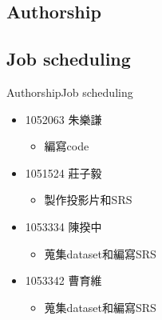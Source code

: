 \documentclass{beamer}
\begin{document}
\begin{CJK*}{UTF8}{bsmi}
\section*{Authorship}
\subsection*{Job scheduling}
\begin{frame}{Authorship}{Job scheduling}
  \begin{itemize}
  \item {
    1052063 朱樂謙
  }
   \begin{itemize}
   \item 編寫code\\[0.5cm]
   \end{itemize}
  \item {
    1051524 莊子毅
  }
   \begin{itemize}
   \item 製作投影片和SRS\\[0.5cm]
   \end{itemize}
  \item {
    1053334 陳揆中
  }
   \begin{itemize}
   \item 蒐集dataset和編寫SRS\\[0.5cm]
   \end{itemize}
  \item {
    1053342 曹育維
  }
   \begin{itemize}
   \item 蒐集dataset和編寫SRS\\[0.5cm]
   \end{itemize}
  \end{itemize}
\end{frame}





\end{CJK*}
\end{document}
